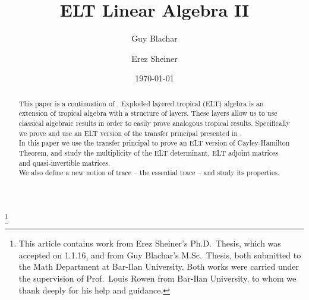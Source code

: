 \documentclass[reqno, british]{amsart}
\theoremstyle{plain}
\theoremstyle{plain}
\theoremstyle{definition}
\theoremstyle{plain}
\theoremstyle{definition}
\theoremstyle{remark}
\theoremstyle{plain}
\theoremstyle{plain}
\begin{document}
\title{ELT Linear Algebra II}
\date{\today}

\author[Guy Blachar]{Guy Blachar}
\address{Department of Mathematics, Bar-Ilan University, Ramat-Gan 52900,
Israel.} 

\author[Erez Sheiner]{Erez Sheiner}
\address{Department of Mathematics, Bar-Ilan University, Ramat-Gan 52900,
Israel.} 

\thanks{This article contains work from Erez Sheiner's Ph.D.\ Thesis, which was accepted on 1.1.16, and from Guy Blachar's M.Sc.\ Thesis, both submitted to the Math Department at Bar-Ilan University. Both works were carried under the supervision of Prof.\ Louis Rowen from Bar-Ilan University, to whom we thank deeply for his help and guidance.}



\begin{abstract}
This paper is a continuation of \cite{BS}. Exploded layered tropical (ELT) algebra is an extension of tropical algebra with a structure of layers. These layers allow us to use classical algebraic results in order to easily prove analogous tropical results. Specifically we prove and use an ELT version of the transfer principal presented in \cite{Akian2008}.\\
In this paper we use the transfer principal to prove an ELT version of Cayley-Hamilton Theorem, and study the multiplicity of the ELT determinant, ELT adjoint matrices and quasi-invertible matrices.\\
We also define a new notion of trace -- the essential trace -- and study its properties.
\end{abstract}

\maketitle

\tableofcontents
{}








\end{document}
